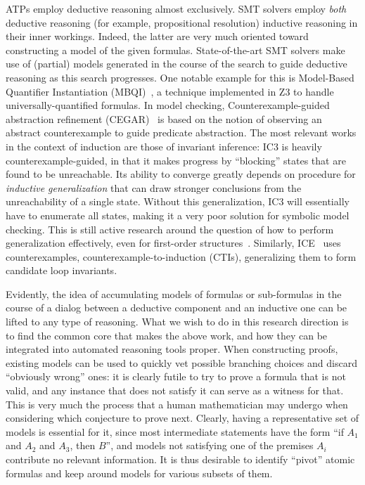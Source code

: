 ATPs employ deductive reasoning almost exclusively.
SMT solvers employ \emph{both} deductive reasoning (for example, propositional resolution) inductive reasoning in their inner workings.
Indeed, the latter are very much oriented toward constructing a model of the given formulas.
State-of-the-art SMT solvers make use of (partial) models generated in the
course of the search to guide deductive reasoning as this search progresses.
One notable example for this is Model-Based Quantifier Instantiation (MBQI)~\cite{CAV2009:Ge},
a technique implemented in Z3 to handle universally-quantified formulas.
In model checking, Counterexample-guided abstraction refinement (CEGAR)~\cite{ASPLOS2006:Solar-Lezama} is based on the notion of observing an abstract counterexample to guide predicate abstraction.
The most relevant works in the context of induction are those of invariant inference:
IC3 is heavily counterexample-guided, in that it makes progress by ``blocking'' states that are found to be unreachable.
Its ability to converge greatly depends on procedure for \emph{inductive generalization} that can draw stronger conclusions from the unreachability of a single state.
Without this generalization, IC3 will essentially have to enumerate all states, making it a very poor solution for symbolic model checking.
This is still active research around the question of how to perform generalization effectively,
even for first-order structures~\cite{CAV2020:Krishnan}.
Similarly, ICE~\cite{CAV2014:Pranav} uses counterexamples, \esp counterexample-to-induction (CTIs), generalizing them to form candidate loop invariants.

Evidently, the idea of accumulating models of formulas or sub-formulas in the course of
a dialog between a deductive component and an inductive one can be lifted to
any type of reasoning.
What we wish to do in this research direction is to find the common core that makes the above work,
and how they can be integrated into automated reasoning tools proper.
When constructing proofs, existing models can be used to quickly vet possible
branching choices and discard ``obviously wrong'' ones: it is clearly futile
to try to prove a formula that is not valid, and any instance that does not
satisfy it can serve as a witness for that.
This is very much the process that a human mathematician may undergo when
considering which conjecture to prove next.
Clearly, having a representative set of models is essential for it, since
most intermediate statements have the form ``if $A_1$ and $A_2$ and $A_3$, then
$B$'', and models not satisfying one of the premises $A_i$ contribute no
relevant information.
It is thus desirable to identify ``pivot'' atomic formulas and keep around
models for various subsets of them.
